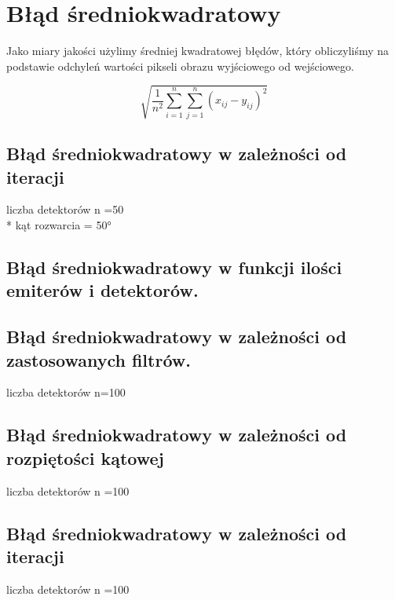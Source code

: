 \documentclass{article}
\begin{document}
\section{Błąd średniokwadratowy}
Jako miary jakości użylimy średniej kwadratowej błędów, który obliczyliśmy na podstawie odchyleń wartości pikseli obrazu wyjściowego od wejściowego.



$$\sqrt{\frac{1}{n^2} \sum\limits_{i=1}^n\sum\limits_{j=1}^n (x_{ij}-y_{ij})^2}$$ 
\clearpage
\subsection{Błąd średniokwadratowy w zależności od iteracji}
\centering liczba detektorów n =50\\*
kąt rozwarcia = \ang{50}
\centering

\subsection
 {Błąd średniokwadratowy w funkcji ilości emiterów i detektorów.}
\centering
\subsection{Błąd średniokwadratowy w zależności od zastosowanych filtrów.}
liczba detektorów n=100

\subsection{Błąd średniokwadratowy w zależności od rozpiętości kątowej}
liczba detektorów n =100
\centering

\subsection{Błąd średniokwadratowy w zależności od iteracji}
liczba detektorów n =100
\centering 
\end{document}
